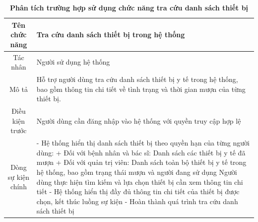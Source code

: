\begin{table}[H]
	\caption{\bfseries \fontsize{12pt}{0pt}\selectfont Phân tích trường hợp sử dụng chức năng tra cứu danh sách thiết bị}
	\centering
	\begin{tabularx}{0.9\textwidth}{|c|X|}
		\hline
		\textbf{Tên chức năng} & \textbf{Tra cứu danh sách thiết bị trong hệ thống}                                                                                              \\
		\hline
		Tác nhân               & Người sử dụng hệ thống                                                                                                                          \\
		\hline
		Mô tả                  & Hỗ trợ người dùng tra cứu danh sách thiết bị y tế trong hệ thống, bao gồm thông tin chi tiết về tình trạng và thời gian mượn của từng thiết bị. \\
		\hline
		Điều kiện trước        & Người dùng cần đăng nhập vào hệ thống với quyền truy cập hợp lệ                                                                                 \\
		\hline
		Dòng sự kiện chính     &
		- Hệ thống hiển thị danh sách thiết bị theo quyền hạn của từng người dùng: \newline
		+ Đối với bệnh nhân và bác sĩ: Danh sách các thiết bị y tế đã mượn \newline
		+ Đối với quản trị viên: Danh sách toàn bộ thiết bị y tế trong hệ thống, bao gồm trạng thái mượn và người đang sử dụng \newline
		Người dùng thực hiện tìm kiếm và lựa chọn thiết bị cần xem thông tin chi tiết \newline
		- Hệ thống hiển thị đầy đủ thông tin chi tiết của thiết bị được chọn, kết thúc luồng sự kiện   \newline
		- Hoàn thành quá trình tra cứu danh sách thiết bị                                                                                                                        \\
		\hline
	\end{tabularx}
\end{table}

